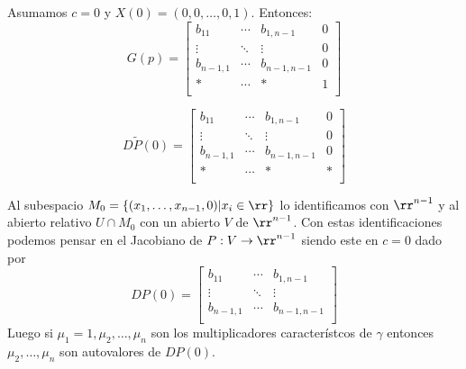 \begin{teorema}
 Asumamos $c=0$ y $X(0)=(0,0,\ldots,0,1)$. Entonces:
 \begin{equation}\label{gp}G(p)=\begin{bmatrix}
         b_{11}&\cdots&b_{1,n-1}&0\\
        \vdots &\ddots&\vdots&0\\
         b_{n-1,1}&\cdots&b_{n-1,n-1}&0\\
         *&\cdots&*&1\\
        \end{bmatrix}
 \end{equation}
 
 \begin{equation}\label{dptil}D\tilde{P}(0)=\begin{bmatrix}
         b_{11}&\cdots&b_{1,n-1}&0\\
        \vdots &\ddots&\vdots&0\\
         b_{n-1,1}&\cdots&b_{n-1,n-1}&0\\
         *&\cdots&*&*\\
        \end{bmatrix}
\end{equation}


Al subespacio $M_0=\{(x_1,\ldots,x_{n-1},0)|x_i\in\rr\}$ lo identificamos con $\rr^{n-1}$ y al abierto relativo $U\cap M_0$ con un abierto $V$ de $\rr^{n-1}$. 
Con estas identificaciones podemos pensar en el Jacobiano de $P:V\to \rr^{n-1}$ siendo este en $c=0$ dado por
 \begin{equation}\label{dp}DP(0)=\begin{bmatrix}
         b_{11}&\cdots&b_{1,n-1}\\
        \vdots &\ddots&\vdots\\
         b_{n-1,1}&\cdots&b_{n-1,n-1}\\
        \end{bmatrix}
\end{equation}
Luego si $\mu_1=1,\mu_2,\ldots,\mu_n$ son los multiplicadores característcos de $\gamma$ entonces $\mu_2,\ldots,\mu_n$ son autovalores de $DP(0)$.

\end{teorema}





